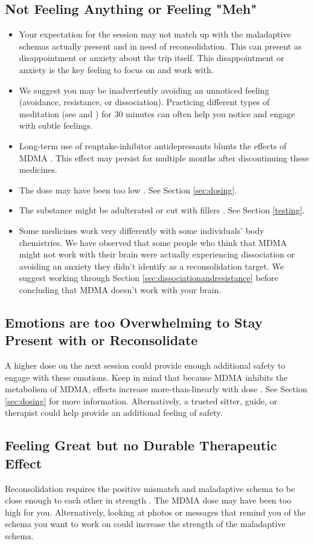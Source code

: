 \documentclass[12pt,letterpaper]{book}
\begin{document}
\subsection*{Not Feeling Anything or Feeling "Meh"}
\begin{itemize}
    \item Your expectation for the session may not match up with the maladaptive schemas actually present and in need of reconsolidation. This can present as disappointment or anxiety about the trip itself. This disappointment or anxiety is the key feeling to focus on and work with.
    \item We suggest you may be inadvertently avoiding an unnoticed feeling (avoidance, resistance, or dissociation). Practicing different types of meditation (see \textcite{rain} and \textcite{bodyscan}) for 30 minutes can often help you notice and engage with subtle feelings.
    \item Long-term use of reuptake-inhibitor antidepressants blunts the effects of MDMA \cite{feducciaSSRIDiscontinuation}. This effect may persist for multiple months after discontinuing these medicines.
    \item The dose may have been too low \cite{bediMDMALowDose}. See Section \ref{sec:dosing}.
    \item The substance might be adulterated or cut with fillers \cite{saleemiAdulterants}. See Section \ref{testing}.
    \item Some medicines work very differently with some individuals' body chemistries. We have observed that some people who think that MDMA might not work with their brain were actually experiencing dissociation or avoiding an anxiety they didn't identify as a reconsolidation target. We suggest working through Section \ref{sec:dissociationandresistance} before concluding that MDMA doesn't work with your brain. 
\end{itemize}
\subsection*{Emotions are too Overwhelming to Stay Present with or Reconsolidate}
A higher dose on the next session could provide enough additional safety to engage with these emotions. Keep in mind that because MDMA inhibits the metabolism of MDMA, effects increase more-than-linearly with dose \cite{de2000nonlinear}. See Section \ref{sec:dosing} for more information. Alternatively, a trusted sitter, guide, or therapist could help provide an additional feeling of safety.
\subsection*{Feeling Great but no Durable Therapeutic Effect}
Reconsolidation requires the positive mismatch and maladaptive schema to be close enough to each other in strength \cite{eckerUnlocking}. The MDMA dose may have been too high for you. Alternatively, looking at photos or messages that remind you of the schema you want to work on could increase the strength of the maladaptive schema.
\end{document}
